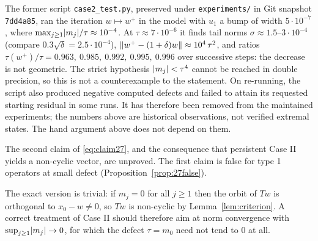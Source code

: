 \begin{remark}
The former script \texttt{case2\_test.py}, preserved under \texttt{experiments/} in Git
snapshot \texttt{7dd4a85}, ran the iteration $w\mapsto w^+$ in the model with $u_1$ a
bump of width $5\cdot10^{-7}$, where $\max_{j\ge1}\lvert m_j\rvert/\tau\approx10^{-4}$. At
$\tau\approx7\cdot10^{-6}$ it finds tail norms $\sigma\approx1.5$--$3\cdot10^{-4}$ (compare
$0.3\sqrt\delta=2.5\cdot10^{-4}$), $\lVert w^+-(1+\delta)w\rVert\approx10^4\,\tau^2$, and ratios
$\tau(w^+)/\tau=0.963,\ 0.985,\ 0.992,\ 0.995,\ 0.996$ over successive steps: the decrease
is not geometric. The strict hypothesis $\lvert m_j\rvert<\tau^4$ cannot be reached in double
precision, so this is not a counterexample to the statement. On re-running, the script also
produced negative computed defects and failed to attain its requested starting residual in
some runs. It has therefore been removed from the maintained experiments; the numbers above
are historical observations, not verified extremal states. The hand argument above does not
depend on them.
\end{remark}

\begin{proposition}[Case II]\label{prop:caseII}\stopen{}
The second claim of \eqref{eq:claim27}, and the consequence that persistent Case II yields a
non-cyclic vector, are unproved. The first claim is false for type 1 operators at small defect
(Proposition~\ref{prop:27false}).
\end{proposition}

\begin{remark}
The exact version is trivial: if $m_j=0$ for all $j\ge1$ then the orbit of $Tw$ is orthogonal to
$x_0-w\ne0$, so $Tw$ is non-cyclic by Lemma~\ref{lem:criterion}. A correct treatment of Case II
should therefore aim at norm convergence with $\sup_{j\ge1}\lvert m_j\rvert\to0$, for which the defect
$\tau=m_0$ need not tend to $0$ at all.
\end{remark}
